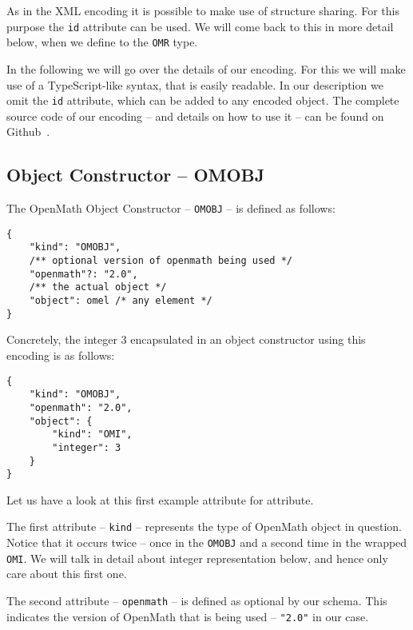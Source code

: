 As in the XML encoding it is possible to make use of structure sharing. 
For this purpose the \texttt{id} attribute can be used. 
We will come back to this in more detail below, when we define to the \texttt{OMR} type.

In the following we will go over the details of our encoding. 
For this we will make use of a TypeScript-like syntax, that is easily readable. 
In our description we omit the \texttt{id} attribute, which can be added to any encoded object. 
The complete source code of our encoding -- and details on how to use it -- can be found on Github~\cite{URL:openmathjson:github}. 

\subsection{Object Constructor -- OMOBJ}

The OpenMath Object Constructor -- \texttt{OMOBJ} -- is defined as follows:
\\\begin{minipage}{\linewidth}
\begin{lstlisting}
{
    "kind": "OMOBJ",
    /** optional version of openmath being used */
    "openmath"?: "2.0",
    /** the actual object */
    "object": omel /* any element */
}
\end{lstlisting}
\end{minipage}
Concretely, the integer 3 encapsulated in an object constructor using this encoding is as follows:
\\\begin{minipage}{\linewidth}
\begin{lstlisting}
{
    "kind": "OMOBJ",
    "openmath": "2.0",
    "object": {
        "kind": "OMI", 
        "integer": 3
    }
}
\end{lstlisting}\end{minipage}

Let us have a look at this first example attribute for attribute. 

The first attribute -- \texttt{kind} -- represents the type of OpenMath object in question. 
Notice that it occurs twice -- once in the \texttt{OMOBJ} and a second time in the wrapped \texttt{OMI}. 
We will talk in detail about integer representation below, and hence only care about this first one. 

The second attribute -- \texttt{openmath} -- is defined as optional by our schema. 
This indicates the version of OpenMath that is being used -- \lstinline{"2.0"} in our case. 

